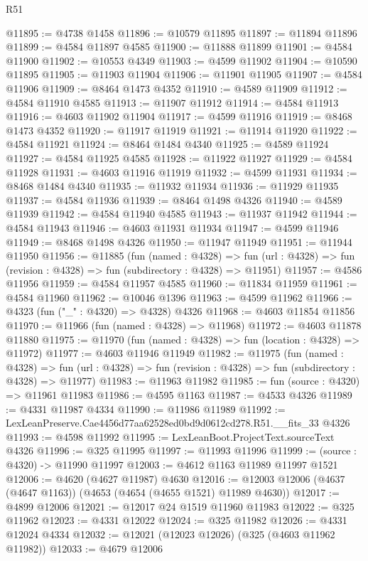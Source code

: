 \begin{lexlean}{R51}
\begin{coremodule}
@11895 := @4738 @1458
@11896 := @10579 @11895
@11897 := @11894 @11896
@11899 := @4584 @11897 @4585
@11900 := @11888 @11899
@11901 := @4584 @11900
@11902 := @10553 @4349
@11903 := @4599 @11902
@11904 := @10590 @11895
@11905 := @11903 @11904
@11906 := @11901 @11905
@11907 := @4584 @11906
@11909 := @8464 @1473 @4352
@11910 := @4589 @11909
@11912 := @4584 @11910 @4585
@11913 := @11907 @11912
@11914 := @4584 @11913
@11916 := @4603 @11902 @11904
@11917 := @4599 @11916
@11919 := @8468 @1473 @4352
@11920 := @11917 @11919
@11921 := @11914 @11920
@11922 := @4584 @11921
@11924 := @8464 @1484 @4340
@11925 := @4589 @11924
@11927 := @4584 @11925 @4585
@11928 := @11922 @11927
@11929 := @4584 @11928
@11931 := @4603 @11916 @11919
@11932 := @4599 @11931
@11934 := @8468 @1484 @4340
@11935 := @11932 @11934
@11936 := @11929 @11935
@11937 := @4584 @11936
@11939 := @8464 @1498 @4326
@11940 := @4589 @11939
@11942 := @4584 @11940 @4585
@11943 := @11937 @11942
@11944 := @4584 @11943
@11946 := @4603 @11931 @11934
@11947 := @4599 @11946
@11949 := @8468 @1498 @4326
@11950 := @11947 @11949
@11951 := @11944 @11950
@11956 := @11885
    (fun (named : @4328) =>
    fun (url : @4328) => fun (revision : @4328) => fun (subdirectory : @4328) => @11951)
@11957 := @4586 @11956
@11959 := @4584 @11957 @4585
@11960 := @11834 @11959
@11961 := @4584 @11960
@11962 := @10046 @1396
@11963 := @4599 @11962
@11966 := @4323 (fun ("_" : @4320) => @4328) @4326
@11968 := @4603 @11854 @11856
@11970 := @11966 (fun (named : @4328) => @11968)
@11972 := @4603 @11878 @11880
@11975 := @11970 (fun (named : @4328) => fun (location : @4328) => @11972)
@11977 := @4603 @11946 @11949
@11982 := @11975
    (fun (named : @4328) =>
    fun (url : @4328) => fun (revision : @4328) => fun (subdirectory : @4328) => @11977)
@11983 := @11963 @11982
@11985 := fun (source : @4320) => @11961 @11983
@11986 := @4595 @1163
@11987 := @4533 @4326
@11989 := @4331 @11987 @4334
@11990 := @11986 @11989
@11992 := LexLeanPreserve.Cae4456d77aa62528ed0bd9d0612cd278.R51.__fits_33 @4326
@11993 := @4598 @11992
@11995 := LexLeanBoot.ProjectText.sourceText @4326
@11996 := @325 @11995
@11997 := @11993 @11996
@11999 := (source : @4320) -> @11990 @11997
@12003 := @4612 @1163 @11989 @11997 @1521
@12006 := @4620 (@4627 @11987) @4630
@12016 := @12003 @12006 (@4637 (@4647 @1163)) (@4653 (@4654 (@4655 @1521) @11989 @4630))
@12017 := @4899 @12006
@12021 := @12017 @24 @1519 @11960 @11983
@12022 := @325 @11962
@12023 := @4331 @12022
@12024 := @325 @11982
@12026 := @4331 @12024 @4334
@12032 := @12021 (@12023 @12026) (@325 (@4603 @11962 @11982))
@12033 := @4679 @12006

\end{coremodule}
\end{lexlean}
